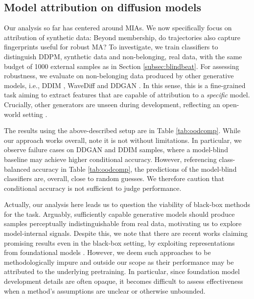 \documentclass{article}
\theoremstyle{remark}
\begin{document}
\subsection{Model attribution on diffusion models}
\label{subsec:ma}

Our analysis so far has centered around MIAs. We now specifically focus on attribution of synthetic data: Beyond membership, do trajectories also capture fingerprints useful for robust MA? To investigate, we train classifiers to distinguish DDPM, synthetic data and non-belonging, real data, with the same budget of 1000 external samples as in Section \ref{subsec:blindbeat}. For assessing robustness, we evaluate on non-belonging data produced by other generative models, i.e., DDIM \citep{song2021denoising}, WaveDiff \citep{phung2023wavediff} and DDGAN \citep{xiao2022tackling}. In this sense, this is a fine-grained task aiming to extract features that are capable of attribution to a \textit{specific} model. Crucially, other generators are unseen during development, reflecting an open-world setting \citep{pmlr-v235-laszkiewicz24a}.

The results using the above-described setup are in Table \ref{tab:oodcomp}. While our approach works overall, note it is not without limitations. In particular, we observe failure cases on DDGAN and DDIM samples, where a model-blind baseline may achieve higher conditional accuracy. However, referencing class-balanced accuracy in Table \ref{tab:oodcomp}, the predictions of the model-blind classifiers are, overall, close to random guesses. We therefore caution that conditional accuracy is not sufficient to judge performance.

Actually, our analysis here leads us to question the viability of black-box methods for the task. Arguably, sufficiently capable generative models should produce samples perceptually indistinguishable from real data, motivating us to explore model-internal signals. Despite this, we note that there are recent works claiming promising results even in the black-box setting, by exploiting representations from foundational models \citep{10.1007/978-3-031-73033-7_16}. However, we deem such approaches to be methodologically impure and outside our scope as their performance may be attributed to the underlying pretraining. In particular, since foundation model development details are often opaque, it becomes difficult to assess effectiveness when a method's assumptions are unclear or otherwise unbounded.
\end{document}

